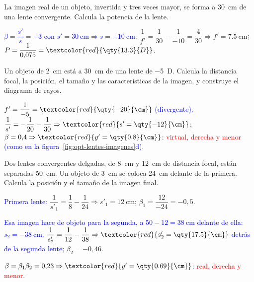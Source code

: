 \begin{exercise}
    La imagen real de un objeto, invertida y tres veces mayor, se forma a \qty{30}{\cm} de una lente convergente. Calcula
    la potencia de la lente.
    \begin{solu}
        \textcolor{blue}{\(\beta = \dfrac{s'}{s} = -3\) con \(s' = \qty{30}{\cm} \Rightarrow s = \qty{-10}{\cm}\).}
        \(\dfrac{1}{f'} = \dfrac{1}{30} - \dfrac{1}{-10} = \dfrac{4}{30} \Rightarrow f' = \qty{7.5}{\cm}\);
        \(P = \dfrac{1}{0{,}075} = \textcolor{red}{\qty{13.3}{D}}\).
    \end{solu}
\end{exercise}

\begin{exercise}
    Un objeto de \qty{2}{\cm} está a \qty{30}{\cm} de una lente de \qty{-5}{D}. Calcula la distancia focal, la posición, el
    tamaño y las características de la imagen, y construye el diagrama de rayos.
    \begin{solu}
        \(f' = \dfrac{1}{-5} = \textcolor{red}{\qty{-20}{\cm}}\) \textcolor{blue}{(divergente).}
        \(\dfrac{1}{s'} = -\dfrac{1}{20} - \dfrac{1}{30} \Rightarrow \textcolor{red}{s' = \qty{-12}{\cm}}\);
        \(\beta = 0{,}4 \Rightarrow \textcolor{red}{y' = \qty{0.8}{\cm}}\): \textcolor{red}{virtual, derecha y menor}
        \textcolor{blue}{(como en la figura~\ref{fig:opt-lentes-imagenes}d).}
    \end{solu}
\end{exercise}

\begin{exercise}
    Dos lentes convergentes delgadas, de \qty{8}{\cm} y \qty{12}{\cm} de distancia focal, están separadas \qty{50}{\cm}. Un
    objeto de \qty{3}{\cm} se coloca \qty{24}{\cm} delante de la primera. Calcula la posición y el tamaño de la imagen final.
    \begin{solu}
        \textcolor{blue}{Primera lente:} \(\dfrac{1}{s'_1} = \dfrac{1}{8} - \dfrac{1}{24} \Rightarrow s'_1 = \qty{12}{\cm}\); \(\beta_1 = \dfrac{12}{-24} = -0{,}5\).

        \textcolor{blue}{Esa imagen hace de objeto para la segunda, a \(50 - 12 = \qty{38}{\cm}\) delante de ella: \(s_2 = \qty{-38}{\cm}\).}
        \(\dfrac{1}{s'_2} = \dfrac{1}{12} - \dfrac{1}{38} \Rightarrow \textcolor{red}{s'_2 = \qty{17.5}{\cm}}\) \textcolor{blue}{detrás de la segunda lente}; \(\beta_2 = -0{,}46\).

        \(\beta = \beta_1\beta_2 = 0{,}23 \Rightarrow \textcolor{red}{y' = \qty{0.69}{\cm}}\): \textcolor{red}{real, derecha y menor}.
    \end{solu}
\end{exercise}


